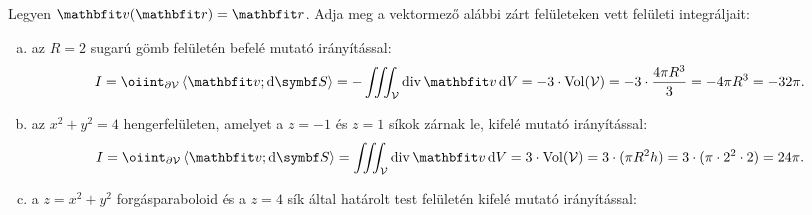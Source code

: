 \documentclass{szb-solution}
\begin{document}
Legyen $\rvec v(\coordvec) = \coordvec$. Adja meg a vektormező alábbi
zárt felületeken vett felületi integráljait:
\begin{enumerate}[a)]
  \item az $R = 2$ sugarú gömb felületén befelé mutató irányítással:
        $$
          I
          = \oiint_{\partial \volimage} \scalar{\rvec v}{\dd \surfvec}
          = - \iiint_{\volimage} \Div \rvec v \dd \volscalar
          = -3 \cdot \operatorname{Vol}(\volimage)
          = -3 \cdot \frac{4\pi R^3}{3}
          = -4 \pi R^3
          = -32 \pi
          \text.
        $$

  \item az $x^2 + y^2 = 4$ hengerfelületen, amelyet a $z = -1$ és
        $z = 1$ síkok zárnak le, kifelé mutató irányítással:
        $$
          I
          = \oiint_{\partial \volimage} \scalar{\rvec v}{\dd \surfvec}
          = \iiint_{\volimage} \Div \rvec v \dd \volscalar
          = 3 \cdot \operatorname{Vol}(\volimage)
          = 3 \cdot (\pi R^2 h)
          = 3 \cdot (\pi \cdot 2^2 \cdot 2)
          = 24 \pi
          \text.
        $$

  \item a $z = x^2 + y^2$ forgásparaboloid és a $z = 4$ sík által
        határolt test felületén kifelé mutató irányítással:


\end{enumerate}
\end{document}
